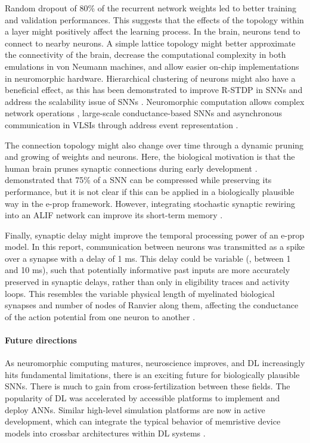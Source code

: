     Random dropout of 80\% of the recurrent network weights led to better training and validation performances.
    This suggests that the effects of the topology within a layer might positively affect the learning process.
    In the brain, neurons tend to connect to nearby neurons.
    A simple lattice topology might better approximate the connectivity of the brain, decrease the computational complexity in both emulations in von Neumann machines, and allow easier on-chip implementations in neuromorphic hardware.
    Hierarchical clustering of neurons might also have a beneficial effect, as this has been demonstrated to improve R-STDP in SNNs \citep{weidel2020unsupervised} and address the scalability issue of SNNs \citep{carrillo2012scalable}.
    Neuromorphic computation allows complex network operations \citep{hasler1990vlsi}, large-scale conductance-based SNNs \citep{yang2019scalable,Yang2019RealTimeNS} and asynchronous communication in VLSIs through address event representation \citep{lazzaro1993silicon,deiss1999pulse}.

    The connection topology might also change over time through a dynamic pruning and growing of weights and neurons.
    Here, the biological motivation is that the human brain prunes synaptic connections during early development \citep{huttenlocher1979synaptic}.
    \citet{elbez2020progressive} demonstrated that 75\% of a SNN can be compressed while preserving its performance, but it is not clear if this can be applied in a biologically plausible way in the e-prop framework.
    However, integrating stochastic synaptic rewiring \citep{kappel2018dynamic} into an ALIF network can improve its short-term memory \citep{bellec2020solution}.

    Finally, synaptic delay might improve the temporal processing power of an e-prop model.
    In this report, communication between neurons was transmitted as a spike over a synapse with a delay of 1 ms.
    This delay could be variable (\eg, between 1 and 10 ms), such that potentially informative past inputs are more accurately preserved in synaptic delays, rather than only in eligibility traces and activity loops.
    This resembles the variable physical length of myelinated biological synapses and number of nodes of Ranvier along them, affecting the conductance of the action potential from one neuron to another \citep{bean2007action}.

\paragraph{Future directions}
    As neuromorphic computing matures, neuroscience improves, and DL increasingly hits fundamental limitations, there is an exciting future for biologically plausible SNNs.
    There is much to gain from cross-fertilization between these fields.
    The popularity of DL was accelerated by accessible platforms to implement and deploy ANNs.
    Similar high-level simulation platforms are now in active development, which can integrate the typical behavior of memristive device models into crossbar architectures within DL systems \citep{lammie2020memtorch}.

